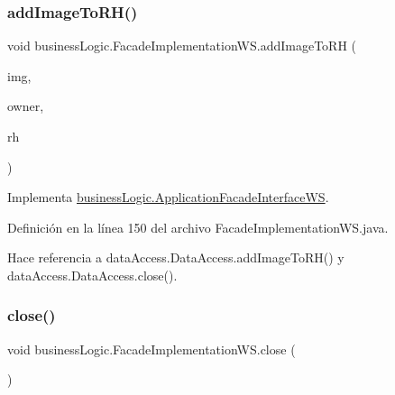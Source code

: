 \subsubsection{\texorpdfstring{addImageToRH()}{addImageToRH()}}
{\footnotesize\ttfamily void business\+Logic.\+Facade\+Implementation\+W\+S.\+add\+Image\+To\+RH (\begin{DoxyParamCaption}\item[{byte \mbox{[}$\,$\mbox{]}}]{img,  }\item[{\mbox{\hyperlink{classdomain_1_1_owner}{Owner}}}]{owner,  }\item[{\mbox{\hyperlink{classdomain_1_1_rural_house}{Rural\+House}}}]{rh }\end{DoxyParamCaption})}



Implementa \mbox{\hyperlink{interfacebusiness_logic_1_1_application_facade_interface_w_s_ad5cf462151e6c43b9088f112eed0ad3f}{business\+Logic.\+Application\+Facade\+Interface\+WS}}.



Definición en la línea 150 del archivo Facade\+Implementation\+W\+S.\+java.


\begin{DoxyCode}{0}

\end{DoxyCode}


Hace referencia a data\+Access.\+Data\+Access.\+add\+Image\+To\+R\+H() y data\+Access.\+Data\+Access.\+close().

\mbox{\label{classbusiness_logic_1_1_facade_implementation_w_s_aaf150e07dd6d71319c6f2f4bf6be1647}} 
\subsubsection{\texorpdfstring{close()}{close()}}
{\footnotesize\ttfamily void business\+Logic.\+Facade\+Implementation\+W\+S.\+close (\begin{DoxyParamCaption}{ }\end{DoxyParamCaption})}



